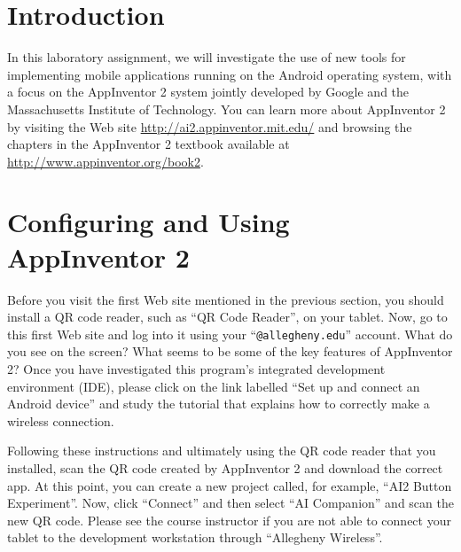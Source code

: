 


\usepackage[compact]{titlesec}



\vspace*{-.1in}
\section*{Introduction}

In this laboratory assignment, we will investigate the use of new tools for implementing mobile applications running on
the Android operating system, with a focus on the AppInventor 2 system jointly developed by Google and the Massachusetts
Institute of Technology.  You can learn more about AppInventor 2 by visiting the Web site
\url{http://ai2.appinventor.mit.edu/} and browsing the chapters in the AppInventor 2 textbook available at
\url{http://www.appinventor.org/book2}.

\section*{Configuring and Using AppInventor 2}

Before you visit the first Web site mentioned in the previous section, you should install a QR code reader, such as ``QR
Code Reader'', on your tablet. Now, go to this first Web site and log into it using your ``{\tt @allegheny.edu}''
account. What do you see on the screen? What seems to be some of the key features of AppInventor 2? Once you have
investigated this program's integrated development environment (IDE), please click on the link labelled ``Set up and
connect an Android device'' and study the tutorial that explains how to correctly make a wireless connection. 

Following these instructions and ultimately using the QR code reader that you installed, scan the QR code created by
AppInventor 2 and download the correct app. At this point, you can create a new project called, for
example, ``AI2 Button Experiment''. Now, click ``Connect'' and then select ``AI Companion'' and scan the new QR code.
Please see the course instructor if you are not able to connect your tablet
to the development workstation through ``Allegheny Wireless''. 

